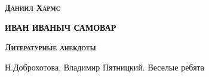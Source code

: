 \documentclass[12pt]{article}
\begin{document}
    \begin{center}
        {\Huge\bf \textsc{Даниил Хармс}}

        \vspace{1cm}

        {\bf ИВАН ИВАНЫЧ САМОВАР}
    \end{center}

    {}
    
    \newpage 

    \begin{center}
        {\Huge\bf \textsc{Литературные анекдоты}}

        \vspace{1cm}

        Н.Доброхотова, Владимир Пятницкий. Веселые ребята
    \end{center}

    
\end{document}

